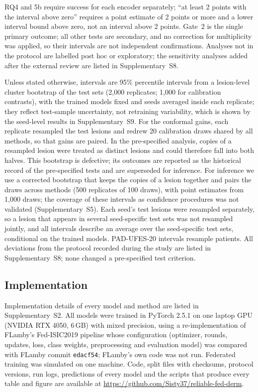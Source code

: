 \documentclass[VANCOUVER,Times1COL]{WileyNJDv5}
\begin{document}
RQ4 and 5b require success for each encoder separately; ``at least 2 points with the interval above
zero'' requires a point estimate of 2 points or more and a lower interval bound above zero, not an
interval above 2 points. Gate~2 is the single primary outcome; all other tests are secondary, and no
correction for multiplicity was applied, so their intervals are not independent confirmations.
Analyses not in the protocol are labelled post hoc or exploratory; the sensitivity analyses added after
the external review are listed in Supplementary~S8.

Unless stated otherwise, intervals are 95\% percentile intervals from a lesion-level cluster bootstrap
\cite{field2007cluster} of the test sets (2,000 replicates; 1,000 for calibration
contrasts), with the trained models fixed and seeds averaged inside each replicate; they reflect
test-sample uncertainty, not retraining variability, which is shown by the seed-level results in
Supplementary~S9. For the conformal gains, each replicate resampled the test lesions and redrew 20
calibration draws shared by all methods, so that gains are paired. In the pre-specified analysis, copies of
a resampled lesion were treated as distinct lesions and could therefore fall into both halves. This bootstrap is defective; its outcomes are reported as the historical record of the pre-specified tests and are superseded for inference. For inference we use a corrected bootstrap that keeps the copies of a lesion together and pairs the draws across methods (500 replicates of 100 draws), with point estimates from 1,000 draws; the coverage of these intervals as confidence procedures was not validated (Supplementary~S5). Each seed's test lesions were resampled separately, so a lesion that appears in several seed-specific test sets was not resampled jointly, and all intervals describe an average over the seed-specific test sets, conditional on the trained models. PAD-UFES-20 intervals resample patients. All deviations from the protocol recorded during the study are
listed in Supplementary~S8; none changed a pre-specified test criterion.

\subsection{Implementation}
\label{sec:impl}

Implementation details of every model and method are listed in Supplementary~S2. All models were
trained in PyTorch 2.5.1 \cite{paszke2019pytorch} on one laptop GPU (NVIDIA RTX 4050,
6\,GB) with mixed precision, using a re-implementation of FLamby's Fed-ISIC2019 pipeline whose
configuration (optimizer, rounds, updates, loss, class weights, preprocessing and evaluation model) was
compared with FLamby commit \texttt{edacf54}; FLamby's own code was not run. Federated training was
simulated on one machine. Code, split files with checksums, protocol versions, run logs, predictions of
every model and the scripts that produce every table and figure are available at
\url{https://github.com/Sisty37/reliable-fed-derm}.
\end{document}
